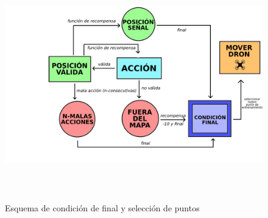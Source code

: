 \begin{figure} [H]
    \begin{center}
    \includegraphics[height=10cm]{imagenes/cap4/11_diagrama_training.png}
    \end{center}
    \caption[Esquema de condición de final y selección de puntos]{Esquema de condición de final y selección de puntos}
    \label{fig:training_phase}
\end{figure}

